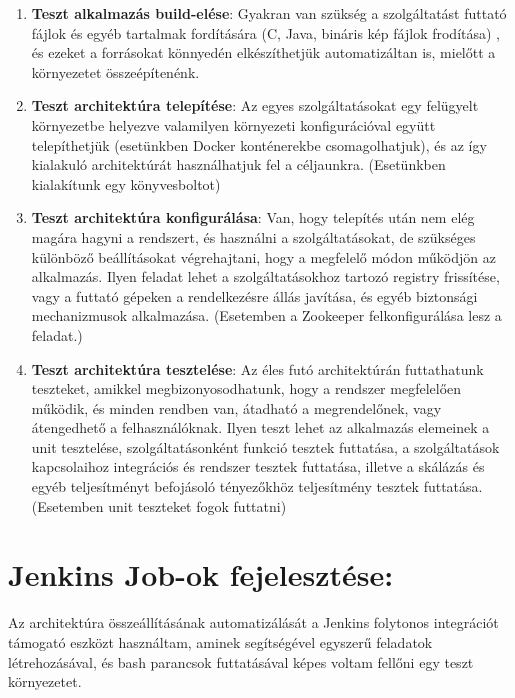 \documentclass[11pt,magyar,a4paper,oneside,]{report}
\begin{document}
\begin{enumerate}
\def\labelenumi{\arabic{enumi}.}
\itemsep1pt\parskip0pt
\item
  \textbf{Teszt alkalmazás build-elése}: Gyakran van szükség a
  szolgáltatást futtató fájlok és egyéb tartalmak fordítására (C, Java,
  bináris kép fájlok frodítása) , és ezeket a forrásokat könnyedén
  elkészíthetjük automatizáltan is, mielőtt a környezetet
  összeépítenénk.
\item
  \textbf{Teszt architektúra telepítése}: Az egyes szolgáltatásokat egy
  felügyelt környezetbe helyezve valamilyen környezeti konfigurációval
  együtt telepíthetjük (esetünkben Docker konténerekbe csomagolhatjuk),
  és az így kialakuló architektúrát használhatjuk fel a céljaunkra.
  (Esetünkben kialakítunk egy könyvesboltot)
\item
  \textbf{Teszt architektúra konfigurálása}: Van, hogy telepítés után
  nem elég magára hagyni a rendszert, és használni a szolgáltatásokat,
  de szükséges különböző beállításokat végrehajtani, hogy a megfelelő
  módon működjön az alkalmazás. Ilyen feladat lehet a szolgáltatásokhoz
  tartozó registry frissítése, vagy a futtató gépeken a rendelkezésre
  állás javítása, és egyéb biztonsági mechanizmusok alkalmazása.
  (Esetemben a Zookeeper felkonfigurálása lesz a feladat.)
\item
  \textbf{Teszt architektúra tesztelése}: Az éles futó architektúrán
  futtathatunk teszteket, amikkel megbizonyosodhatunk, hogy a rendszer
  megfelelően működik, és minden rendben van, átadható a megrendelőnek,
  vagy átengedhető a felhasználóknak. Ilyen teszt lehet az alkalmazás
  elemeinek a unit tesztelése, szolgáltatásonként funkció tesztek
  futtatása, a szolgáltatások kapcsolaihoz integrációs és rendszer
  tesztek futtatása, illetve a skálázás és egyéb teljesítményt
  befojásoló tényezőkhöz teljesítmény tesztek futtatása. (Esetemben unit
  teszteket fogok futtatni)
\end{enumerate}

\section{Jenkins Job-ok
fejelesztése:}\label{jenkins-job-ok-fejelesztuxe9se}

Az architektúra összeállításának automatizálását a Jenkins folytonos
integrációt támogató eszközt használtam, aminek segítségével egyszerű
feladatok létrehozásával, és bash parancsok futtatásával képes voltam
fellőni egy teszt környezetet.
\end{document}
